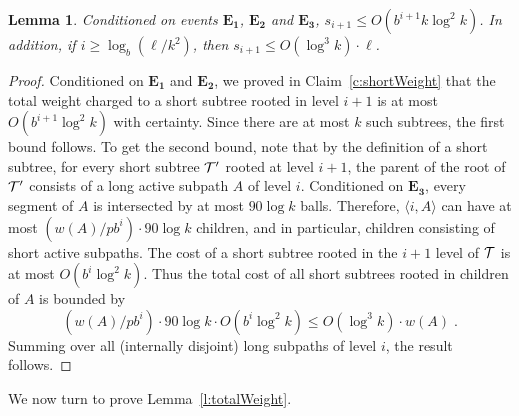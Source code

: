 \documentclass[twoside,leqno,twocolumn]{article}
\newtheorem{lemma}[theorem]{Lemma}
\begin{document}
\begin{lemma}\label{l:short}
Conditioned on events $\mathbf{E_1}$, $\mathbf{E_2}$ and $\mathbf{E_3}$, $s_{i+1} \le O(b^{i+1} k\log^2 k)$.  In addition, if $i \ge \log_b(\ell/k^2)$, then $s_{i+1} \le O(\log ^3k)\cdot \ell$.
\end{lemma}
\begin{proof}
Conditioned on $\mathbf{E_1}$ and $\mathbf{E_2}$, we proved in Claim~\ref{c:shortWeight} that the total weight charged to a short subtree rooted in level $i+1$ is at most $O(b^{i+1} \log^2 k)$ with certainty. Since there are at most $k$ such subtrees, the first bound follows.
To get the second bound, note that by the definition of a short subtree, for every short subtree ${\cal T}'$ rooted at level $i+1$, the parent of the root of ${\cal T}'$ consists of a long active subpath $A$ of level $i$. Conditioned on $\mathbf{E_3}$, every segment of $A$ is intersected by at most $90 \log k$ balls. Therefore, $\langle i,A \rangle$ can have at most $(w(A) / p b^i) \cdot 90 \log k$ children, and in particular, children consisting of short active subpaths. The cost of a short subtree rooted in the $i+1$ level of ${\cal T}$ is at most $O(b^{i}\log^2 k)$. Thus the total cost of all short subtrees rooted in children of $A$ is bounded by 
$$(w(A) / p b^i) \cdot 90 \log k \cdot O(b^{i} \log^2 k) \le O(\log^3 k)  \cdot w(A) \;.$$
Summing over all (internally disjoint) long subpaths of level $i$, the result follows.
\end{proof}
We now turn to prove Lemma~\ref{l:totalWeight}.
\end{document}

